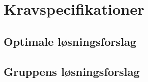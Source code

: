 \chapter{Kravspecifikationer}


\section{Optimale løsningsforslag}


\section{Gruppens løsningsforslag}

